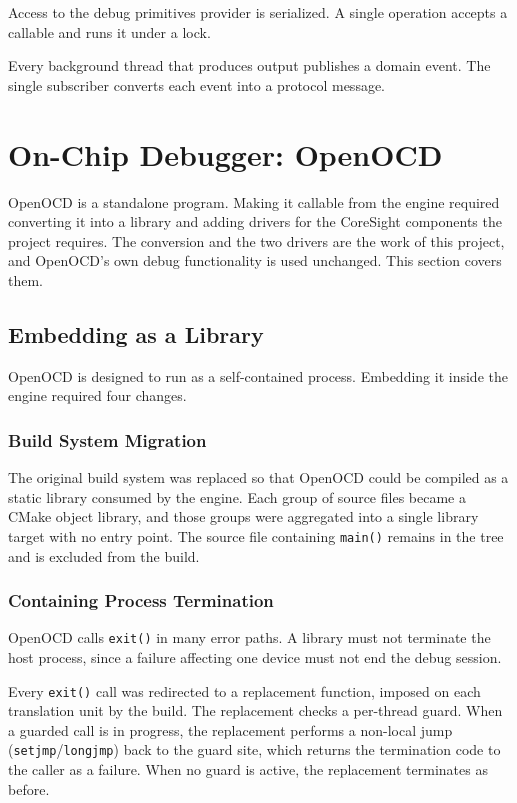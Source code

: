 Access to the debug primitives provider is serialized. A single operation accepts a callable and runs it under a lock.

Every background thread that produces output publishes a domain event. The single subscriber converts each event into a protocol message.

\section{On-Chip Debugger: OpenOCD}
\label{sec:trace_impl}

OpenOCD is a standalone program. Making it callable from the engine required converting it into a library and adding drivers for the CoreSight components the project requires. The conversion and the two drivers are the work of this project, and OpenOCD's own debug functionality is used unchanged. This section covers them.

\subsection{Embedding as a Library}
\label{subsec:openocd_lib}

OpenOCD is designed to run as a self-contained process. Embedding it inside the engine required four changes.

\subsubsection{Build System Migration}
The original build system was replaced so that OpenOCD could be compiled as a static library consumed by the engine. Each group of source files became a CMake object library, and those groups were aggregated into a single library target with no entry point. The source file containing \texttt{main()} remains in the tree and is excluded from the build.

\subsubsection{Containing Process Termination}
OpenOCD calls \texttt{exit()} in many error paths. A library must not terminate the host process, since a failure affecting one device must not end the debug session.

Every \texttt{exit()} call was redirected to a replacement function, imposed on each translation unit by the build. The replacement checks a per-thread guard. When a guarded call is in progress, the replacement performs a non-local jump (\texttt{setjmp}/\texttt{longjmp}) back to the guard site, which returns the termination code to the caller as a failure. When no guard is active, the replacement terminates as before.

